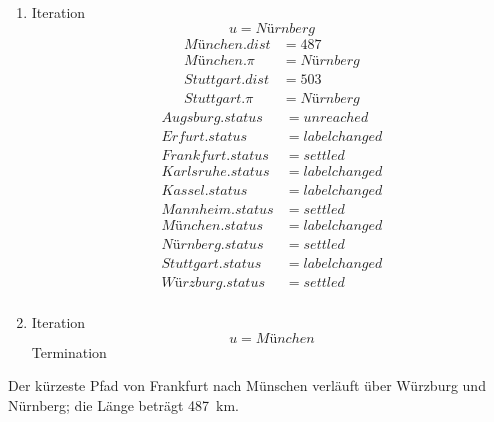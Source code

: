 \documentclass[a4paper]{scrartcl}
\begin{document}
\begin{enumerate}
    \item Iteration
        \begin{equation*}
            u = Nürnberg
        \end{equation*}
        \begin{align*}
            München.dist &= 487 \\
            München.\pi &= Nürnberg \\
            Stuttgart.dist &= 503 \\
            Stuttgart.\pi &= Nürnberg
        \end{align*}
        \begin{align*}
            Augsburg.status &= unreached \\
            Erfurt.status &= labelchanged \\
            Frankfurt.status &= settled \\
            Karlsruhe.status &= labelchanged \\
            Kassel.status &= labelchanged \\
            Mannheim.status &= settled \\
            München.status &= labelchanged \\
            Nürnberg.status &= settled \\
            Stuttgart.status &= labelchanged \\
            Würzburg.status &= settled \\
        \end{align*}
        
    \item Iteration
        \begin{equation*}
            u = München
        \end{equation*}
        Termination

\end{enumerate}

Der kürzeste Pfad von Frankfurt nach Münschen verläuft über
Würzburg und Nürnberg; die Länge beträgt \SI{487}{\kilo\meter}.
\end{document}
